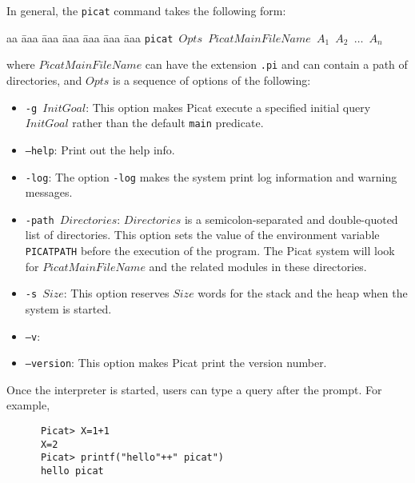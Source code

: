 In general, the \texttt{picat} command takes the following form:
\begin{tabbing}
aa \= aaa \= aaa \= aaa \= aaa \= aaa \= aaa \kill
\> \texttt{picat $Opts$ $PicatMainFileName$ $A_1$ $A_2$ $\ldots$ $A_n$}
\end{tabbing}
where $PicatMainFileName$ can have the extension \texttt{.pi} and can contain a path of directories, and $Opts$ is a sequence of options of the following:
\begin{itemize}
\item \texttt{-g $InitGoal$}: This option makes Picat execute a specified initial query $InitGoal$ rather than the default \texttt{main} predicate.

\item \texttt{--help}: Print out the help info.

\item \texttt{-log}: The option \texttt{-log} makes the system print log information and warning messages. 

\item \texttt{-path $Directories$}: $Directories$ is a semicolon-separated and double-quoted list of directories. This option sets the value of the environment variable \texttt{PICATPATH} before the execution of the program. The Picat system will look for $PicatMainFileName$ and the related modules in these directories. 

\item \texttt{-s $Size$}: This option reserves $Size$ words for the stack and the heap when the system is started.

\item \texttt{--v}:
\item \texttt{--version}: This option makes Picat print the version number.
\end{itemize}

Once the interpreter is started, users can type a query after the prompt. For example,
\begin{verbatim}
      Picat> X=1+1
      X=2
      Picat> printf("hello"++" picat")
      hello picat
\end{verbatim}

